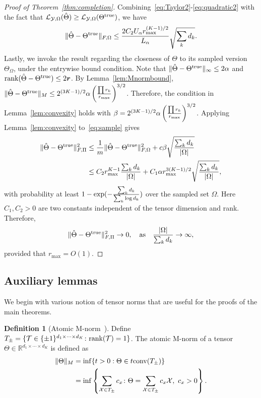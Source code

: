 \documentclass[11pt]{article}
\theoremstyle{plain}
\theoremstyle{definition}
\newtheorem{defn}{Definition}
\begin{document}
\begin{proof}[Proof of Theorem~\ref{thm:completion}]
Combining~\eqref{eq:Taylor2}-\eqref{eq:quadratic2} with the fact that $\mathcal{L}_{\mathcal{Y},\Omega}(\hat \Theta)\geq \mathcal{L}_{\mathcal{Y},\Omega}(\Theta^{\text{true}})$, we have
\begin{equation}\label{eq:sample}
\lVert\hat \Theta-\Theta^{\text{true}}\rVert_{F,\Omega}\leq {2C_2U_\alpha  r_{\max}^{(K-1)/2} \over L_\alpha} \sqrt{\sum_kd_k}.
\end{equation}
Lastly, we invoke the result regarding the closeness of $\Theta$ to its sampled version $\Theta_{\Omega}$, under the entrywise bound condition. Note that $\lVert\hat\Theta-\Theta^{\text{true}}\rVert_\infty\leq 2\alpha$ and $\text{rank}(\hat \Theta-\Theta^{\text{true}})\leq 2\bm{r}$. By Lemma~\ref{lem:Mnormbound}, $\lVert\hat \Theta-\Theta^{\text{true}}\rVert_M\leq 2^{(3K-1)/2} \alpha \left({\prod r_k \over r_{\max}}\right)^{3/2}$. Therefore, the condition in Lemma~\ref{lem:convexity} holds with $\beta=2^{(3K-1)/2}\alpha \left({\prod r_k \over r_{\max}}\right)^{3/2}$. Applying Lemma~\ref{lem:convexity} to~\eqref{eq:sample} gives
\begin{align}
 \lVert\hat \Theta-\Theta^{\text{true}}\rVert_{F,\Pi}^2&\leq {1\over m}\lVert\hat \Theta-\Theta^{\text{true}}\rVert_{F,\Omega}^2+c\beta\sqrt{\sum_k d_k\over |\Omega|}\\
 &\leq {C_2  r^{K-1}_{\max}} {\sum_k d_k \over |\Omega|}+C_1 \alpha r_{\max}^{3(K-1)/2}\sqrt{\sum_kd_k\over |\Omega|},
\end{align}
with probability at least $1-\exp(-{\sum_kd_k\over \sum_k \log d_k})$ over the sampled set $\Omega$. Here $C_1, C_2>0$ are two constants independent of the tensor dimension and rank. Therefore,
\[
 \lVert\hat \Theta-\Theta^{\text{true}}\rVert_{F,\Pi}^2\to 0,\quad \text{as}\quad {|\Omega|\over \sum_kd_k}\to \infty,
\]
provided that $r_{\max}=O(1)$.
\end{proof}

\subsection{Auxiliary lemmas}
\label{sec:lemma}


We begin with various notion of tensor norms that are useful for the proofs of the main theorems.

\begin{defn}[Atomic M-norm~\citep{ghadermarzy2019near}]
Define $T_{\pm}=\{\mathcal{T}\in\{\pm 1 \}^{d_1\times \cdots \times d_K}\colon \text{rank}(\mathcal{T})=1\}$. The atomic M-norm of a tensor $\Theta\in\mathbb{R}^{d_1\times \cdots \times d_K}$ is defined as
\begin{align}
\lVert\Theta\rVert_M&=\inf\{t>0: \Theta\in t\text{conv}(T_{\pm})\}\\
&=\inf\left\{\sum_{\mathcal{X}\in T_{\pm}}c_x\colon \Theta=\sum_{\mathcal{X}\in T_{\pm}} c_x\mathcal{X}, \ c_x>0\right\}.
\end{align}
\end{defn}
\end{document}
